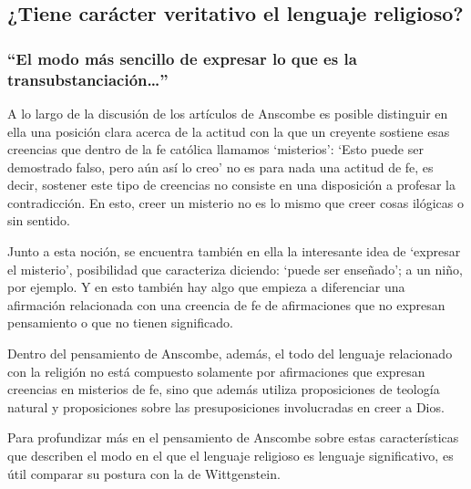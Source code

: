 \subsection{¿Tiene carácter veritativo el lenguaje religioso?}

\subsubsection{\enquote{El modo más sencillo de expresar lo que es la transubstanciación\ldots}}

A lo largo de la discusión de los artículos de Anscombe es posible distinguir en ella una posición clara acerca de la actitud con la que un creyente sostiene esas creencias que dentro de la fe católica llamamos `misterios': \enquote*{Esto puede ser demostrado falso, pero aún así lo creo} no es para nada una actitud de fe, es decir, sostener este tipo de creencias no consiste en una disposición a profesar la contradicción. En esto, creer un misterio no es lo mismo que creer cosas ilógicas o sin sentido.

Junto a esta noción, se encuentra también en ella la interesante idea de \enquote*{expresar el misterio}, posibilidad que caracteriza diciendo: \enquote*{puede ser enseñado}; a un niño, por ejemplo. Y en esto también hay algo que empieza a diferenciar una afirmación relacionada con una creencia de fe de afirmaciones que no expresan pensamiento o que no tienen significado.

Dentro del pensamiento de Anscombe, además, el todo del lenguaje relacionado con la religión no está compuesto solamente por afirmaciones que expresan creencias en misterios de fe, sino que además utiliza proposiciones de teología natural y proposiciones sobre las presuposiciones involucradas en creer a Dios.

Para profundizar más en el pensamiento de Anscombe sobre estas características que describen el modo en el que el lenguaje religioso es lenguaje significativo, es útil comparar su postura con la de Wittgenstein.

